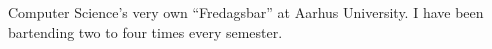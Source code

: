 Computer Science's very own ``Fredagsbar'' at Aarhus University. I have been
bartending two to four times every semester.
